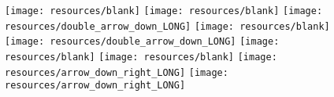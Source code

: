 \documentclass[11pt]{article}
\newcommand{\backgroundimage}{celltypes_horizontal_add_arrows_ALT_FIRST_LVL.pdf} %
\begin{document}


\begin{figure}[htbp]
  \centering
  \begin{minipage}[t]{0.250\textwidth} %
    \centering
    \vspace{-0.19355\linewidth} %
    \texttt{[image: resources/blank]}
    \texttt{[image: resources/blank]}
    \texttt{[image: resources/double\_arrow\_down\_LONG]} %
    \texttt{[image: resources/blank]}
    \texttt{[image: resources/double\_arrow\_down\_LONG]} %
    \texttt{[image: resources/blank]}
    \texttt{[image: resources/blank]}
    \texttt{[image: resources/arrow\_down\_right\_LONG]} %
    \texttt{[image: resources/arrow\_down\_right\_LONG]} %



\end{minipage}
\end{figure}
\end{document}
